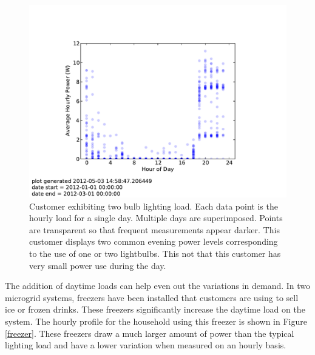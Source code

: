 \documentclass[conference]{IEEEtran}
\begin{document}
\begin{figure}[h]
\begin{center}
\includegraphics[trim = 0.7in 0.8in 0.7in 1.1in, clip, width=\columnwidth]
{figures/two_bulb_profile.pdf}
\end{center}
\caption{Customer exhibiting two bulb lighting load.
Each data point is the hourly load for a single day.
Multiple days are superimposed.
Points are transparent so that frequent measurements appear darker.
This customer displays two common evening power levels corresponding
to the use of one or two lightbulbs.
This not that this customer has very small power use during the day.}
\label{two-bulb-profile}
\end{figure}

The addition of daytime loads can help even out the variations
in demand.
In two microgrid systems, freezers have been installed that customers are using to
sell ice or frozen drinks.
These freezers significantly increase the daytime load on the system.
The hourly profile for the household using this freezer
is shown in Figure \ref{freezer}.
These freezers draw a much larger amount of power than the
typical lighting load and have a lower variation when measured
on an hourly basis.
\end{document}
